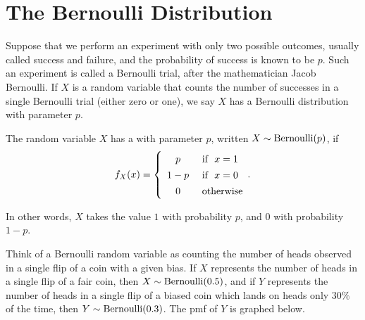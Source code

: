 \section{The Bernoulli Distribution}\label{BernoulliDist}

Suppose that we perform an experiment with only two possible outcomes, usually called success and failure, and the probability of success is known to be $p$. Such an experiment is called a Bernoulli trial, after the mathematician Jacob Bernoulli. If $X$ is a random variable that counts the number of successes in a single Bernoulli trial (either zero or one), we say $X$ has a Bernoulli distribution with parameter $p$.

\begin{definition}The random variable $X$ has a  with parameter $p$, written $X \sim \operatorname{Bernoulli}(p)$, if
$$f_X(x) = \left\{
\renewcommand*{\arraystretch}{1.35}
\begin{array}{cl}
      p & \text{ if \ } x =1 \\
      1-p & \text{ if \ } x =0 \\ 
      0 & \text{ otherwise} \\ \end{array}.
      \renewcommand*{\arraystretch}{1}
\right.$$

In other words, $X$ takes the value $1$ with probability $p$, and $0$ with probability $1-p$.
\end{definition}

Think of a Bernoulli random variable as counting the number of heads observed in a single flip of a coin with a given bias. If $X$ represents the number of heads in a single flip of a fair coin, then $X \sim \operatorname{Bernoulli}(0.5)$, and if $Y$ represents the number of heads in a single flip of a biased coin which lands on heads only $30\%$ of the time, then $Y \sim \operatorname{Bernoulli}(0.3)$. The pmf of $Y$ is graphed below.

\begin{center}
\end{center}

